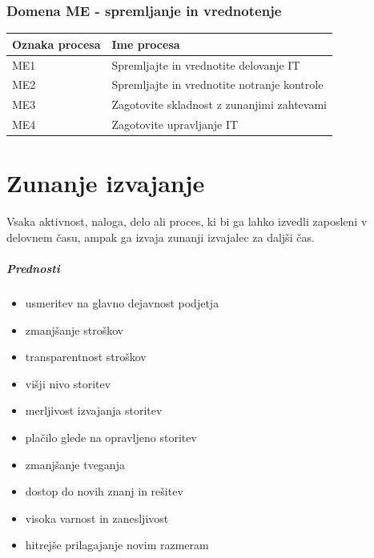 \documentclass[a4paper,12pt]{report}
\begin{document}
      \subsection{Domena ME - spremljanje in vrednotenje}
      \begin{center}
         \begin{tabular}{|l|l|}
            \hline
            \textbf{Oznaka procesa} & \textbf{Ime procesa} \\
            \hline
            ME1 & Spremljajte in vrednotite delovanje IT\\
            ME2 & Spremljajte in vrednotite notranje kontrole\\
            ME3 & Zagotovite skladnost z zunanjimi zahtevami\\
            ME4 & Zagotovite upravljanje IT\\
            \hline
         \end{tabular}
      \end{center}

\chapter{Zunanje izvajanje}
      Vsaka aktivnost, naloga, delo ali proces, ki bi ga lahko izvedli zaposleni v delovnem času, ampak ga izvaja zunanji izvajalec za daljši čas.

      \paragraph{Prednosti}
      \begin{itemize}
         \item usmeritev na glavno dejavnost podjetja
         \item zmanjšanje stroškov
         \item transparentnost stroškov
         \item višji nivo storitev
         \item merljivost izvajanja storitev
         \item plačilo glede na opravljeno storitev
         \item zmanjšanje tveganja
         \item dostop do novih znanj in rešitev
         \item visoka varnost in zanesljivost
         \item hitrejše prilagajanje novim razmeram
      \end{itemize}
\end{document}
